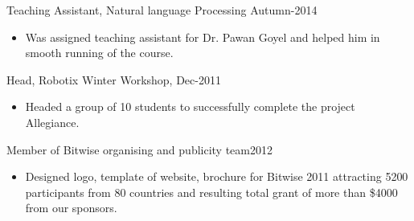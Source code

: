 \documentclass[hidelinks,margin,line,10pt,a4paper]{resume}
\begin{document}
\begin{resume}
\begin{list2}
\item 	Teaching Assistant, Natural language Processing  \hfill Autumn-2014\vspace{1mm}%
\begin{itemize}\vspace{-0.5em}
\renewcommand\labelitemi{--}
\item Was assigned teaching assistant for Dr. Pawan Goyel and helped him in smooth running of the course.
\end{itemize}

\item 	Head, Robotix Winter Workshop,  \hfill Dec-2011\vspace{1mm}%
\begin{itemize}\vspace{-0.5em}
\renewcommand\labelitemi{--}
\item Headed a group of 10 students to successfully complete the project Allegiance.
\end{itemize}

\item 	Member of Bitwise organising and publicity team\hfill 2012\vspace{1mm}%

\begin{itemize}\vspace{-0.5em}
\renewcommand\labelitemi{--}
\item Designed logo, template of website, brochure for Bitwise 2011 attracting 5200 participants from 80 countries and resulting total grant of more than \$4000 from our sponsors. 
\end{itemize}

\end{list2}



\end{resume}
\end{document}
